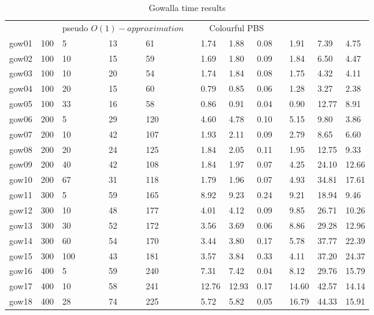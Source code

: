 \begin{table}[H]
    \caption{Gowalla time results}\label{table:gowalla_time}
    \footnotesize
    \begin{tabularx}{\textwidth}{llllllXXXlXXX}
    \firsthline
        \multicolumn{5}{c}{Instance}& \quad & \multicolumn{3}{c}{pseudo $O(1)-approximation$}& \quad & \multicolumn{3}{c}{Colourful PBS}\\
        gow01 & 100 & 5 & 13 & 61 && 1.74 & 1.88 & 0.08 && 1.91 & 7.39 & 4.75\\
        gow02 & 100 & 10 & 15 & 59 && 1.69 & 1.80 & 0.09 && 1.84 & 6.50 & 4.47\\
        gow03 & 100 & 10 & 20 & 54 && 1.74 & 1.84 & 0.08 && 1.75 & 4.32 & 4.11\\
        gow04 & 100 & 20 & 15 & 60 && 0.79 & 0.85 & 0.06 && 1.28 & 3.27 & 2.38\\
        gow05 & 100 & 33 & 16 & 58 && 0.86 & 0.91 & 0.04 && 0.90 & 12.77 & 8.91\\
        gow06 & 200 & 5 & 29 & 120 && 4.60 & 4.78 & 0.10 && 5.15 & 9.80 & 3.86\\
        gow07 & 200 & 10 & 42 & 107 && 1.93 & 2.11 & 0.09 && 2.79 & 8.65 & 6.60\\
        gow08 & 200 & 20 & 24 & 125 && 1.84 & 2.05 & 0.11 && 1.95 & 12.75 & 9.33\\
        gow09 & 200 & 40 & 42 & 108 && 1.84 & 1.97 & 0.07 && 4.25 & 24.10 & 12.66\\
        gow10 & 200 & 67 & 31 & 118 && 1.79 & 1.96 & 0.07 && 4.93 & 34.81 & 17.61\\
        gow11 & 300 & 5 & 59 & 165 && 8.92 & 9.23 & 0.24 && 9.21 & 18.94 & 9.46\\
        gow12 & 300 & 10 & 48 & 177 && 4.01 & 4.12 & 0.09 && 9.85 & 26.71 & 10.26\\
        gow13 & 300 & 30 & 52 & 172 && 3.56 & 3.69 & 0.06 && 8.86 & 29.28 & 12.96\\
        gow14 & 300 & 60 & 54 & 170 && 3.44 & 3.80 & 0.17 && 5.78 & 37.77 & 22.39\\
        gow15 & 300 & 100 & 43 & 181 && 3.57 & 3.84 & 0.33 && 4.11 & 37.20 & 24.37\\
        gow16 & 400 & 5 & 59 & 240 && 7.31 & 7.42 & 0.04 && 8.12 & 29.76 & 15.79\\
        gow17 & 400 & 10 & 58 & 241 && 12.76 & 12.93 & 0.17 && 14.60 & 42.57 & 14.14\\
        gow18 & 400 & 28 & 74 & 225 && 5.72 & 5.82 & 0.05 && 16.79 & 44.33 & 15.91\\

\end{tabularx}
\end{table}
